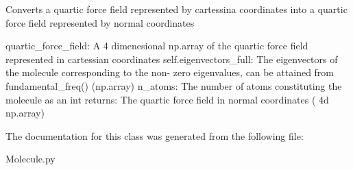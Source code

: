 \begin{DoxyVerb}Converts a quartic force field represented by cartessina coordinates
into a quartic force field represented by normal coordinates

quartic_force_field: A 4 dimenesional np.array of the quartic force field
           represented in cartessian coordinates
self.eigenvectors_full: The eigenvectors of the molecule corresponding to the non-
zero eigenvalues, can be attained from fundamental_freq() (np.array)
n_atoms: The number of atoms constituting the molecule as an int
returns: The quartic force field in normal coordinates ( 4d np.array)
\end{DoxyVerb}
 

The documentation for this class was generated from the following file\+:\begin{DoxyCompactItemize}
\item 
Molecule.\+py\end{DoxyCompactItemize}
